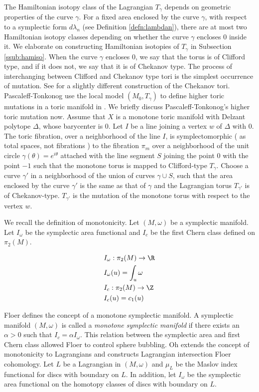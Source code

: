 The Hamiltonian isotopy class of the Lagrangian $T_\gamma$ depends on geometric properties of the curve $\gamma$.  For a fixed area enclosed by the curve $\gamma$, with respect  to a  symplectic form $d\lambda_n$ (see Definition \ref{defn:lambdan}),  there are at most two Hamiltonian isotopy classes depending on whether the curve $\gamma$ encloses $0$ inside it.  We elaborate on constructing Hamiltonian isotopies of $T_\gamma$ in Subsection \ref{ssub:hamiso}.  When the curve  $\gamma$ encloses 0,  we say that the torus is of Clifford type,  and if it does not,  we say that it is of Chekanov type.  The process of interchanging between Clifford and Chekanov type tori is the simplest occurrence of mutation.  See \cite{chekschlenk:twisttori} for a slightly different construction of the Chekanov tori.  Pascaleff-Tonkonog use the local model $(M_0, T_\gamma)$ to define higher toric mutations in a toric manifold in \cite{wall}. We briefly discuss Pascaleff-Tonkonog's higher toric mutation now.  Assume that $X$ is a monotone toric manifold with Delzant polytope $\Delta$, whose barycenter is 0.  Let $I$ be a line joining a vertex $w$ of $\Delta$  with $0$.  The toric fibration, over a neighborhood of  the line $I$,  is symplectomorphic ( as total spaces,  not fibrations ) to the fibration $\pi_m$ over a neighborhood  of the unit circle $\gamma(\theta)=e^{i\theta} $ attached with the line segment $S$ joining the point $0$ with the point $-1$ such that the monotone torus is mapped to Clifford-type $T_\gamma$.   Choose a curve $\gamma'$ in a neighborhood of the union of curves $\gamma \cup S$, such that the area enclosed by the curve $\gamma'$ is the same as that of $\gamma$ and the Lagrangian torus $T_{\gamma'}$ is of Chekanov-type.  $T_{\gamma'}$ is the mutation of the monotone torus with respect to the vertex $w$. 

We recall the definition of monotonicity.  Let $(M, \omega)$  be a  symplectic manifold. Let $I_\omega$ be the symplectic area functional and  $I_c$ be the first Chern class defined on $\pi_2(M)$. 

\begin{align*}
    &I_\omega : \pi_2(M)\to \R \\
    &I_\omega(u) = \int_u \omega \\
    &I_c : \pi_2(M) \to \Z\\
    &I_c(u) = c_1(u)
\end{align*}


\noindent  Floer \cite{floer:symfixpoint} defines the concept of a monotone symplectic manifold.  A symplectic manifold $(M, \omega)$ is called a \textit{monotone symplectic manifold} if there exists an $\alpha>0$ such that $I_c= \alpha I_\omega$.  This relation between the symplectic area and first Chern class allowed Floer to control sphere bubbling.  Oh  \cite{ohMonotone} extends the concept of monotonicity to Lagrangians  and constructs Lagrangian intersection Floer cohomology.  Let $L$ be a Lagrangian in $(M, \omega)$ and $\mu_L$ be the Maslov index functional for discs with boundary on $L$. In addition, let $I_\omega$ be the symplectic area functional on the homotopy classes of discs with boundary on $L$. 

